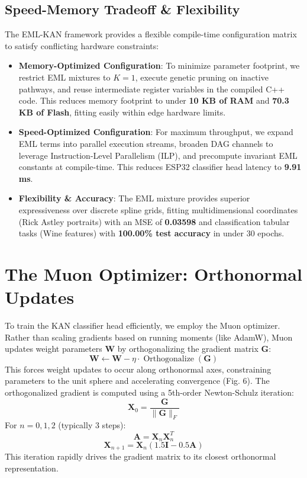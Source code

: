 \documentclass[10pt,journal,compsoc]{IEEEtran}
\theoremstyle{definition}
\begin{document}
\subsection{Speed-Memory Tradeoff \& Flexibility}
The EML-KAN framework provides a flexible compile-time configuration matrix to satisfy conflicting hardware constraints:
\begin{itemize}
    \item \textbf{Memory-Optimized Configuration}: To minimize parameter footprint, we restrict EML mixtures to $K=1$, execute genetic pruning on inactive pathways, and reuse intermediate register variables in the compiled C++ code. This reduces memory footprint to under \textbf{10 KB of RAM} and \textbf{70.3 KB of Flash}, fitting easily within edge hardware limits.
    \item \textbf{Speed-Optimized Configuration}: For maximum throughput, we expand EML terms into parallel execution streams, broaden DAG channels to leverage Instruction-Level Parallelism (ILP), and precompute invariant EML constants at compile-time. This reduces ESP32 classifier head latency to \textbf{9.91 ms}.
    \item \textbf{Flexibility \& Accuracy}: The EML mixture provides superior expressiveness over discrete spline grids, fitting multidimensional coordinates (Rick Astley portraits) with an MSE of \textbf{0.03598} and classification tabular tasks (Wine features) with \textbf{100.00\% test accuracy} in under 30 epochs.
\end{itemize}

\section{The Muon Optimizer: Orthonormal Updates}
To train the KAN classifier head efficiently, we employ the Muon optimizer. Rather than scaling gradients based on running moments (like AdamW), Muon updates weight parameters $\mathbf{W}$ by orthogonalizing the gradient matrix $\mathbf{G}$:
\begin{equation}
\mathbf{W} \leftarrow \mathbf{W} - \eta \cdot \operatorname{Orthogonalize}(\mathbf{G})
\end{equation}
This forces weight updates to occur along orthonormal axes, constraining parameters to the unit sphere and accelerating convergence (Fig. 6). The orthogonalized gradient is computed using a 5th-order Newton-Schulz iteration:
\begin{equation}
\mathbf{X}_0 = \frac{\mathbf{G}}{\|\mathbf{G}\|_F}
\end{equation}
For $n = 0, 1, 2$ (typically 3 steps):
\begin{equation}
\mathbf{A} = \mathbf{X}_n \mathbf{X}_n^T
\end{equation}
\begin{equation}
\mathbf{X}_{n+1} = \mathbf{X}_n \left( 1.5 \mathbf{I} - 0.5 \mathbf{A} \right)
\end{equation}
This iteration rapidly drives the gradient matrix to its closest orthonormal representation.
\end{document}

